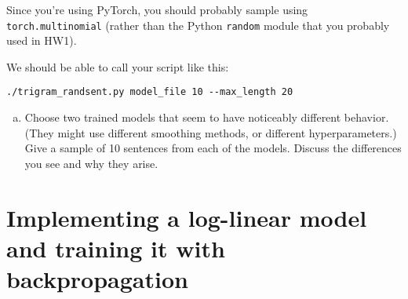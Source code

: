 \documentclass[12pt]{article}
\theoremstyle{plain}
\theoremstyle{definition}
\theoremstyle{remark}
\begin{document}
Since you’re using PyTorch, you should probably sample using \texttt{torch.multinomial} (rather than the Python \texttt{random} module that you probably used in HW1).

We should be able to call your script like this:
\begin{verbatim}
./trigram_randsent.py model_file 10 --max_length 20
\end{verbatim}

\begin{enumerate}[(a)]
\item Choose two trained models that seem to have noticeably different behavior. (They might use different smoothing methods, or different hyperparameters.) Give a sample of 10 sentences from each of the models. Discuss the differences you see and why they arise.
\end{enumerate}

\section{Implementing a log-linear model and training it with backpropagation}
\end{document}
